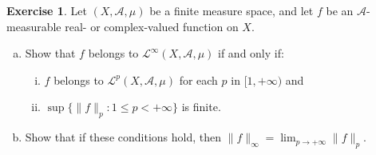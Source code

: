 \documentclass[11pt,a4paper,twoside]{article}
\theoremstyle{definition}
\newcounter{excounter}
\newtheorem{exercise}[excounter]{Exercise}
\begin{document}
\begin{exercise}

  Let $(X, \mathscr{A}, \mu)$ be a finite measure space, and let $f$ be an $\mathscr{A}$-measurable
  real- or complex-valued function on $X$.

  \begin{enumerate}[(a)]

  \item \label{point:a} Show that $f$ belongs to $\mathscr{L}^\infty (X, \mathscr{A}, \mu)$ if and only if:

    \begin{enumerate}[(i)]

    \item \label{it:i} $f$ belongs to $\mathscr{L}^p (X, \mathscr{A}, \mu)$ for each $p$ in $[1, {+\infty})$ and
    \item \label{it:ii} $\sup \{ \| f \|_p : 1 \leq p < +\infty \}$ is finite.

    \end{enumerate}

  \item Show that if these conditions hold, then $\| f \|_\infty = \lim_{p \to +\infty} \| f \|_p$.

  \end{enumerate}

\end{exercise}
\end{document}
